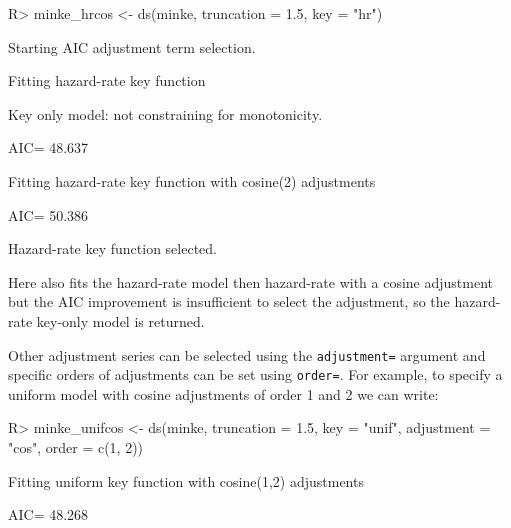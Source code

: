 \documentclass[article,shortnames]{jss}
\begin{document}
\begin{CodeChunk}
\begin{CodeInput}
R> minke_hrcos <- ds(minke, truncation = 1.5, key = "hr")
\end{CodeInput}
\begin{CodeOutput}
Starting AIC adjustment term selection.
\end{CodeOutput}
\begin{CodeOutput}
Fitting hazard-rate key function
\end{CodeOutput}
\begin{CodeOutput}
Key only model: not constraining for monotonicity.
\end{CodeOutput}
\begin{CodeOutput}
AIC= 48.637
\end{CodeOutput}
\begin{CodeOutput}
Fitting hazard-rate key function with cosine(2) adjustments
\end{CodeOutput}
\begin{CodeOutput}
AIC= 50.386
\end{CodeOutput}
\begin{CodeOutput}

Hazard-rate key function selected.
\end{CodeOutput}
\end{CodeChunk}

Here  also fits the hazard-rate model then hazard-rate with a
cosine adjustment but the AIC improvement is insufficient to select the
adjustment, so the hazard-rate key-only model is returned.

Other adjustment series can be selected using the \texttt{adjustment=}
argument and specific orders of adjustments can be set using
\texttt{order=}. For example, to specify a uniform model with cosine
adjustments of order 1 and 2 we can write:

\begin{CodeChunk}
\begin{CodeInput}
R> minke_unifcos <- ds(minke, truncation = 1.5, key = "unif",
                    adjustment = "cos", order = c(1, 2))
\end{CodeInput}
\begin{CodeOutput}
Fitting uniform key function with cosine(1,2) adjustments
\end{CodeOutput}
\begin{CodeOutput}
AIC= 48.268
\end{CodeOutput}
\end{CodeChunk}
\end{document}
